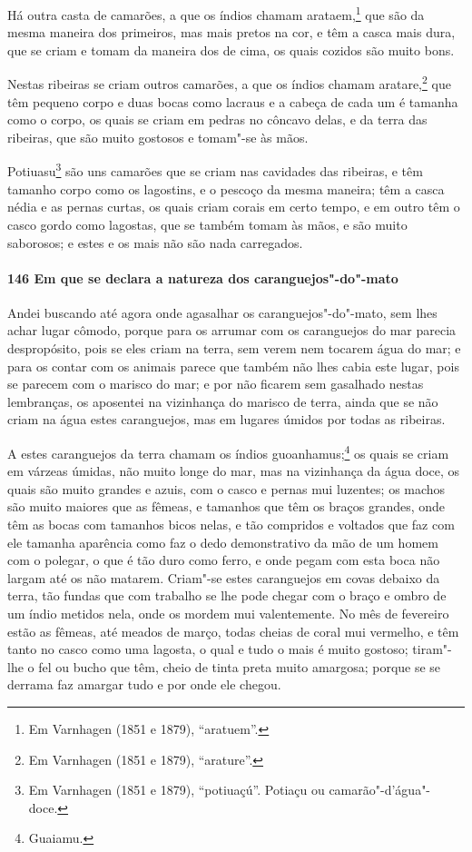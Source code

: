 Há outra casta de camarões, a que os índios chamam arataem,\footnote{ Em Varnhagen (1851 e
1879), ``aratuem''.} que são da mesma maneira dos primeiros, mas mais pretos na cor, e
têm a casca mais dura, que se criam e tomam da maneira dos de cima, os quais cozidos são
muito bons.

Nestas ribeiras se criam outros camarões, a que os índios chamam aratare,\footnote{ Em
Varnhagen (1851 e 1879), ``arature''.} que têm pequeno corpo e duas bocas como lacraus e
a cabeça de cada um é tamanha como o corpo, os quais se criam em pedras no côncavo delas,
e da terra das ribeiras, que são muito gostosos e tomam"-se às mãos.

Potiuasu\footnote{ Em Varnhagen (1851 e 1879), ``potiuaçú''. Potiaçu ou
camarão"-d'água"-doce.} são uns camarões que se criam nas cavidades das ribeiras, e têm
tamanho corpo como os lagostins, e o pescoço da mesma maneira; têm a casca nédia e as
pernas curtas, os quais criam corais em certo tempo, e em outro têm o casco gordo como
lagostas, que se também tomam às mãos, e são muito saborosos; e estes e os mais não são
nada carregados.

\paragraph{146 Em que se declara a natureza dos caranguejos"-do"-mato}

Andei buscando até agora onde agasalhar os caranguejos"-do"-mato, sem lhes achar lugar
cômodo, porque para os arrumar com os caranguejos do mar parecia despropósito, pois se
eles criam na terra, sem verem nem tocarem água do mar; e para os contar com os animais
parece que também não lhes cabia este lugar, pois se parecem com o marisco do mar; e por
não ficarem sem gasalhado nestas lembranças, os aposentei na vizinhança do marisco de
terra, ainda que se não criam na água estes caranguejos, mas em lugares úmidos por todas
as ribeiras.

A estes caranguejos da terra chamam os índios guoanhamus;\footnote{ Guaiamu.} os quais se
criam em várzeas úmidas, não muito longe do mar, mas na vizinhança da água doce, os quais
são muito grandes e azuis, com o casco e pernas mui luzentes; os machos são muito maiores
que as fêmeas, e tamanhos que têm os braços grandes, onde têm as bocas com tamanhos bicos
nelas, e tão compridos e voltados que faz com ele tamanha aparência como faz o dedo
demonstrativo da mão de um homem com o polegar, o que é tão duro como ferro, e onde pegam
com esta boca não largam até os não matarem. Criam"-se estes caranguejos em covas debaixo
da terra, tão fundas que com trabalho se lhe pode chegar com o braço e ombro de um índio
metidos nela, onde os mordem mui valentemente. No mês de fevereiro estão as fêmeas, até
meados de março, todas cheias de coral mui vermelho, e têm tanto no casco como uma
lagosta, o qual e tudo o mais é muito gostoso; tiram"-lhe o fel ou bucho que têm, cheio de
tinta preta muito amargosa; porque se se derrama faz amargar tudo e por onde ele chegou.

